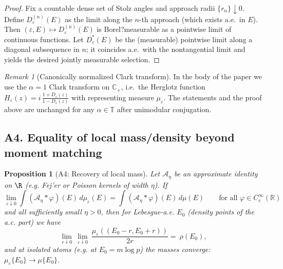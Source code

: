 ﻿\documentclass[12pt,a4paper]{article}
\newtheorem{proposition}[theorem]{Proposition}
\theoremstyle{definition}
\theoremstyle{remark}
\newtheorem{remark}[theorem]{Remark}
\newcommand{\CC}{\mathbb{C}}
\newcommand{\RR}{\mathbb{R}}
\newcommand{\TT}{\mathbb{T}}
\begin{document}
\begin{proof}
Fix a countable dense set of Stolz angles and approach radii $\{r_n\}\downarrow0$. Define $D_\varepsilon^{(n)}(E)$ as the limit along the $n$-th approach (which exists a.e.\ in $E$). Then $(\varepsilon,E)\mapsto D_\varepsilon^{(n)}(E)$ is Borel?measurable as a pointwise limit of continuous functions. Let $D_\varepsilon^\ast(E)$ be the (measurable) pointwise limit along a diagonal subsequence in $n$; it coincides a.e.\ with the nontangential limit and yields the desired jointly measurable selection.
\end{proof}

\begin{remark}[Canonically normalized Clark transform]
\label{rem:A3-normalization}
In the body of the paper we use the $\alpha=1$ Clark transform on $\CC_+$, i.e.\ the Herglotz function $\displaystyle H_\varepsilon(z)=i\,\frac{1+D_\varepsilon(z)}{1-D_\varepsilon(z)}$ with representing measure $\mu_\varepsilon$. The statements and the proof above are unchanged for any $\alpha\in\TT$ after unimodular conjugation.
\end{remark}

\subsection{A4. Equality of local mass/density beyond moment matching}

\begin{proposition}[A4: Recovery of local mass]
\label{prop:A4}
Let $\mathcal A_\eta$ be an approximate identity on $\R$ (e.g.
 Fej'er or Poisson kernels of width $\eta$). If
\begin{equation*}
  \lim_{\varepsilon\downarrow0}\int (\mathcal A_\eta * \varphi)(E)\,d\mu_\varepsilon(E)
  = \int (\mathcal A_\eta * \varphi)(E)\,d\mu(E)\qquad\text{for all }\varphi\in C_c^\infty(\RR)
\end{equation*}
and all sufficiently small $\eta>0$, then for Lebesgue-a.e.
 $E_0$ (density points of the a.c.
 part) we have
\begin{equation*}
  \lim_{r\downarrow0}\ \lim_{\varepsilon\downarrow0}\ \frac{\mu_\varepsilon((E_0-r,E_0+r))}{2r}
  =\ \rho(E_0),
\end{equation*}
and at isolated atoms (e.g.
 at $E_0=m\log p$) the masses converge: $\mu_\varepsilon\{E_0\}\to\mu\{E_0\}$.
\end{proposition}
\end{document}
